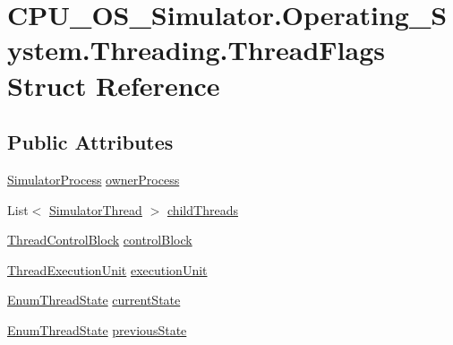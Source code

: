 \hypertarget{struct_c_p_u___o_s___simulator_1_1_operating___system_1_1_threading_1_1_thread_flags}{}\section{C\+P\+U\+\_\+\+O\+S\+\_\+\+Simulator.\+Operating\+\_\+\+System.\+Threading.\+Thread\+Flags Struct Reference}
\label{struct_c_p_u___o_s___simulator_1_1_operating___system_1_1_threading_1_1_thread_flags}
\subsection*{Public Attributes}
\begin{DoxyCompactItemize}
\item 
\hyperlink{class_c_p_u___o_s___simulator_1_1_operating___system_1_1_simulator_process}{Simulator\+Process} \hyperlink{struct_c_p_u___o_s___simulator_1_1_operating___system_1_1_threading_1_1_thread_flags_a221fa945feaddce8cf77888e2346ae89}{owner\+Process}
\item 
List$<$ \hyperlink{class_c_p_u___o_s___simulator_1_1_operating___system_1_1_threading_1_1_simulator_thread}{Simulator\+Thread} $>$ \hyperlink{struct_c_p_u___o_s___simulator_1_1_operating___system_1_1_threading_1_1_thread_flags_ac16ee9d27f576e74b32f7d6adc428791}{child\+Threads}
\item 
\hyperlink{class_c_p_u___o_s___simulator_1_1_operating___system_1_1_threading_1_1_thread_control_block}{Thread\+Control\+Block} \hyperlink{struct_c_p_u___o_s___simulator_1_1_operating___system_1_1_threading_1_1_thread_flags_a64038f3c7b2598bb4365002668132fb9}{control\+Block}
\item 
\hyperlink{class_c_p_u___o_s___simulator_1_1_operating___system_1_1_threading_1_1_thread_execution_unit}{Thread\+Execution\+Unit} \hyperlink{struct_c_p_u___o_s___simulator_1_1_operating___system_1_1_threading_1_1_thread_flags_afc9d9feb6b1b8ed24d2fb42583df38f2}{execution\+Unit}
\item 
\hyperlink{namespace_c_p_u___o_s___simulator_1_1_operating___system_1_1_threading_af7d2481e1618940da9be7dcc5aff9472}{Enum\+Thread\+State} \hyperlink{struct_c_p_u___o_s___simulator_1_1_operating___system_1_1_threading_1_1_thread_flags_a59cb7b9d6d8b632f08f4be053af34581}{current\+State}
\item 
\hyperlink{namespace_c_p_u___o_s___simulator_1_1_operating___system_1_1_threading_af7d2481e1618940da9be7dcc5aff9472}{Enum\+Thread\+State} \hyperlink{struct_c_p_u___o_s___simulator_1_1_operating___system_1_1_threading_1_1_thread_flags_a36a82d73377290fac958bb0434a37496}{previous\+State}

\end{DoxyCompactItemize}
